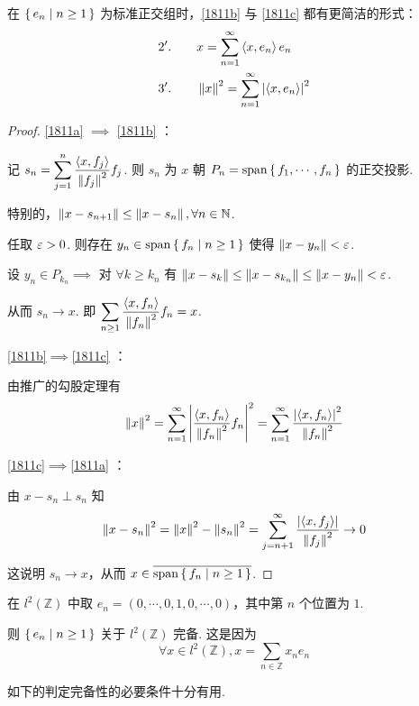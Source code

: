 \begin{hint}
    在 $\set{e_n|n\ge 1}$ 为标准正交组时，\ref{1811b} 与 \ref{1811c} 都有更简洁的形式：
$$
\begin{aligned}
    2'. \qquad & x=\sum_{n=1}^\infty\left\langle{x,e_n}\right\rangle e_n\\
    3'. \qquad & \left\lVert{x}\right\rVert^2=\sum_{n=1}^\infty\left\lvert{\left\langle{x,e_n}\right\rangle}\right\rvert^2
\end{aligned}
$$
\end{hint}

\begin{proof}
    \ref{1811a} $\implies$ \ref{1811b} ：

    记 $s_n=\displaystyle\sum_{j=1}^n\frac{\left\langle{x,f_j}\right\rangle}{\left\lVert{f_j}\right\rVert^2}f_j$. 则 $s_n$ 为 $x$ 朝 $P_n=\mathrm{span}\set{f_1,\cdots,f_n}$ 的正交投影.

    特别的，$\left\lVert{x-s_{n+1}}\right\rVert\le\left\lVert{x-s_n}\right\rVert,\forall n\in\mathbb{N}$.

    任取 $\varepsilon>0$. 则存在 $y_n\in\mathrm{span}\set{f_n|n\ge 1}$ 使得 $\left\lVert{x-y_n}\right\rVert<\varepsilon$.

    设 $y_n\in P_{k_n}\implies$ 对 $\forall k\ge k_n$ 有 $\left\lVert{x-s_k}\right\rVert\le\left\lVert{x-s_{k_n}}\right\rVert\le\left\lVert{x-y_n}\right\rVert<\varepsilon$.

    从而 $s_n\to x$. 即 $\displaystyle\sum_{n\ge 1}\frac{\left\langle{x,f_n}\right\rangle}{\left\lVert{f_n}\right\rVert^2}f_n=x$.

    \ref{1811b}$\implies$\ref{1811c} ：

    由推广的勾股定理有
$$
\left\lVert{x}\right\rVert^2=\sum_{n=1}^\infty\left\lvert{\frac{\left\langle{x,f_n}\right\rangle}{\left\lVert{f_n}\right\rVert^2}f_n}\right\rvert^2=\sum_{n=1}^\infty\frac{\left\lvert{\left\langle{x,f_n}\right\rangle}\right\rvert^2}{\left\lVert{f_n}\right\rVert^2}
$$

    \ref{1811c}$\implies$\ref{1811a} ：

    由 $x-s_n\perp s_n$ 知
$$
\left\lVert{x-s_n}\right\rVert^2=\left\lVert{x}\right\rVert^2-\left\lVert{s_n}\right\rVert^2=\sum_{j=n+1}^\infty\frac{\left\lvert{\left\langle{x,f_j}\right\rangle}\right\rvert}{\left\lVert{f_j}\right\rVert^2}\to 0
$$

    这说明 $s_n\to x$，从而 $x\in\overline{\mathrm{span}\set{f_n|n\ge 1}}$.
\end{proof}

\begin{example}
    在 $l^2(\mathbb{Z})$ 中取 $e_n=(0,\cdots,0,1,0,\cdots,0)$，其中第 $n$ 个位置为 $1$.

    则 $\set{e_n|n\ge 1}$ 关于 $l^2(\mathbb{Z})$ 完备. 这是因为
$$
\forall x\in l^2(\mathbb{Z}),x=\sum_{n\in\mathbb{Z}}x_ne_n
$$
\end{example}

如下的判定完备性的必要条件十分有用.

